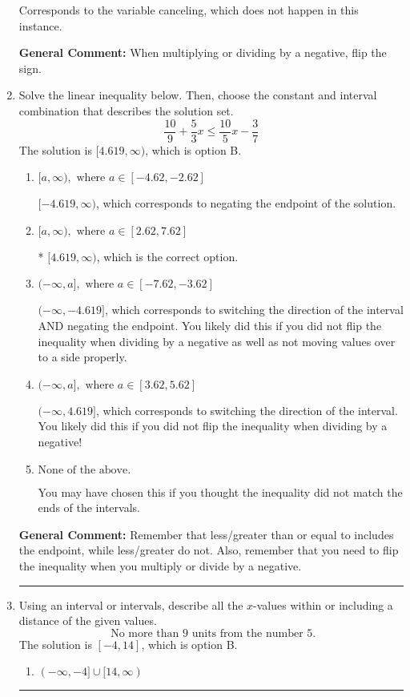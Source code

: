 \documentclass{extbook}[14pt]
\newcommand{\litem}[1]{\item #1

\rule{\textwidth}{0.4pt}}
\begin{document}
\begin{enumerate}
{\begin{enumerate}[label=\Alph*.]
Corresponds to the variable canceling, which does not happen in this instance.
\end{enumerate}

\textbf{General Comment:} When multiplying or dividing by a negative, flip the sign.
}
\litem{
Solve the linear inequality below. Then, choose the constant and interval combination that describes the solution set.
\[ \frac{10}{9} + \frac{5}{3} x \leq \frac{10}{5} x - \frac{3}{7} \]The solution is \( [4.619, \infty) \), which is option B.\begin{enumerate}[label=\Alph*.]
\item \( [a, \infty), \text{ where } a \in [-4.62, -2.62] \)

 $[-4.619, \infty)$, which corresponds to negating the endpoint of the solution.
\item \( [a, \infty), \text{ where } a \in [2.62, 7.62] \)

* $[4.619, \infty)$, which is the correct option.
\item \( (-\infty, a], \text{ where } a \in [-7.62, -3.62] \)

 $(-\infty, -4.619]$, which corresponds to switching the direction of the interval AND negating the endpoint. You likely did this if you did not flip the inequality when dividing by a negative as well as not moving values over to a side properly.
\item \( (-\infty, a], \text{ where } a \in [3.62, 5.62] \)

 $(-\infty, 4.619]$, which corresponds to switching the direction of the interval. You likely did this if you did not flip the inequality when dividing by a negative!
\item \( \text{None of the above}. \)

You may have chosen this if you thought the inequality did not match the ends of the intervals.
\end{enumerate}

\textbf{General Comment:} Remember that less/greater than or equal to includes the endpoint, while less/greater do not. Also, remember that you need to flip the inequality when you multiply or divide by a negative.
}
\litem{
Using an interval or intervals, describe all the $x$-values within or including a distance of the given values.
\[ \text{ No more than } 9 \text{ units from the number } 5. \]The solution is \( [-4, 14] \), which is option B.\begin{enumerate}[label=\Alph*.]
\item \( (-\infty, -4] \cup [14, \infty) \)


\end{enumerate}}
\end{enumerate}
\end{document}
